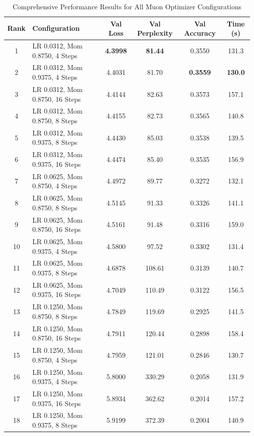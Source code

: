 \documentclass[11pt,a4paper]{article}
\begin{document}
\begin{table}[H]
\centering
\caption{Comprehensive Performance Results for All Muon Optimizer Configurations}
\label{tab:detailed_results}
\begin{tabular}{@{}clcccc@{}}
\toprule
\textbf{Rank} & \textbf{Configuration} & \textbf{Val Loss} & \textbf{Val Perplexity} & \textbf{Val Accuracy} & \textbf{Time (s)} \\
\midrule
1 & LR 0.0312, Mom 0.8750, 4 Steps & \textbf{4.3998} & \textbf{81.44} & 0.3550 & 131.3 \\
2 & LR 0.0312, Mom 0.9375, 4 Steps & 4.4031 & 81.70 & \textbf{0.3559} & \textbf{130.0} \\
3 & LR 0.0312, Mom 0.8750, 16 Steps & 4.4144 & 82.63 & 0.3573 & 157.1 \\
4 & LR 0.0312, Mom 0.8750, 8 Steps & 4.4155 & 82.73 & 0.3565 & 140.8 \\
5 & LR 0.0312, Mom 0.9375, 8 Steps & 4.4430 & 85.03 & 0.3538 & 139.5 \\
6 & LR 0.0312, Mom 0.9375, 16 Steps & 4.4474 & 85.40 & 0.3535 & 156.9 \\
\midrule
7 & LR 0.0625, Mom 0.8750, 4 Steps & 4.4972 & 89.77 & 0.3272 & 132.1 \\
8 & LR 0.0625, Mom 0.8750, 8 Steps & 4.5145 & 91.33 & 0.3326 & 141.1 \\
9 & LR 0.0625, Mom 0.8750, 16 Steps & 4.5161 & 91.48 & 0.3316 & 159.0 \\
10 & LR 0.0625, Mom 0.9375, 4 Steps & 4.5800 & 97.52 & 0.3302 & 131.4 \\
11 & LR 0.0625, Mom 0.9375, 8 Steps & 4.6878 & 108.61 & 0.3139 & 140.7 \\
12 & LR 0.0625, Mom 0.9375, 16 Steps & 4.7049 & 110.49 & 0.3122 & 156.5 \\
\midrule
13 & LR 0.1250, Mom 0.8750, 8 Steps & 4.7849 & 119.69 & 0.2925 & 141.5 \\
14 & LR 0.1250, Mom 0.8750, 16 Steps & 4.7911 & 120.44 & 0.2898 & 158.4 \\
15 & LR 0.1250, Mom 0.8750, 4 Steps & 4.7959 & 121.01 & 0.2846 & 130.7 \\
\midrule
16 & LR 0.1250, Mom 0.9375, 4 Steps & 5.8000 & 330.29 & 0.2058 & 131.9 \\
17 & LR 0.1250, Mom 0.9375, 16 Steps & 5.8934 & 362.62 & 0.2014 & 157.2 \\
18 & LR 0.1250, Mom 0.9375, 8 Steps & 5.9199 & 372.39 & 0.2004 & 140.9 \\
\bottomrule
\end{tabular}
\end{table}
\end{document}
